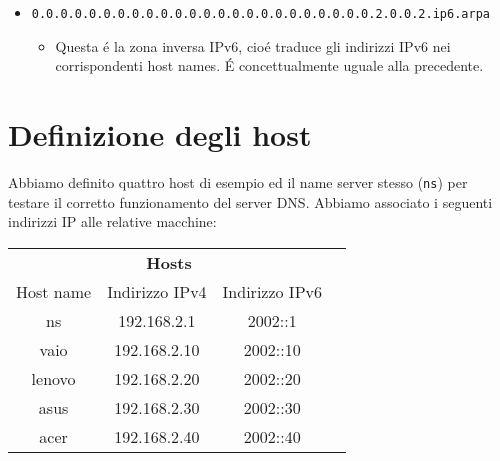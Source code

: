 \documentclass[9pt, a4paper, oneside]{article}
\begin{document}
\begin{itemize}
\begin{itemize}
								notare l'uso 
								della classe 
								\texttt{PTR} 
								cio\'e 
								\texttt{PoinTeR}
								in cui la 
								parte host 
								degli indirizi 
								\emph{punta} ad 
								un nome di 
								machhina.
						\end{itemize}
					\item
						\texttt{0.0.0.0.0.0.0.0.0.0.0.0.0.0.0.0.0.0.0.0.0.0.0.0.2.0.0.2.ip6.arpa}
						\begin{itemize}
							\item
								Questa \'e la 
								zona inversa 
								IPv6, cio\'e  
								traduce gli 
								indirizzi IPv6
								nei  
								corrispondenti
								host names.
								\'E 
								concettualmente 
								uguale alla 
								precedente.
						\end{itemize}
				\end{itemize}
		\section{Definizione degli host}
			\par
				Abbiamo definito quattro host di esempio ed il 
				name server stesso (\texttt{ns}) per testare il 
				corretto funzionamento del server DNS. Abbiamo  
				associato i seguenti indirizzi IP alle 
				relative macchine:
		                \begin{table}[h]
					\begin{center}
                        			\begin{tabular}{cccc}
                                			\hline
			                                \multicolumn{3}{c}{\textbf{Hosts}} \\
                        			        \cline{1-3}
Host name & Indirizzo IPv4 & Indirizzo IPv6 \\ \hline
ns	&192.168.2.1&	2002::1\\
vaio	&192.168.2.10&	2002::10\\
lenovo	&192.168.2.20&	2002::20\\
asus	&192.168.2.30&	2002::30\\
acer	&192.168.2.40&	2002::40\\
\hline
			                        \end{tabular}
					\end{center}
                		\end{table}
\end{document}
